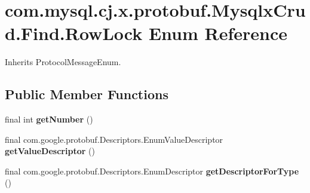 \hypertarget{enumcom_1_1mysql_1_1cj_1_1x_1_1protobuf_1_1_mysqlx_crud_1_1_find_1_1_row_lock}{}\section{com.\+mysql.\+cj.\+x.\+protobuf.\+Mysqlx\+Crud.\+Find.\+Row\+Lock Enum Reference}
\label{enumcom_1_1mysql_1_1cj_1_1x_1_1protobuf_1_1_mysqlx_crud_1_1_find_1_1_row_lock}


Inherits Protocol\+Message\+Enum.

\subsection*{Public Member Functions}
\begin{DoxyCompactItemize}
\item 
\mbox{\label{enumcom_1_1mysql_1_1cj_1_1x_1_1protobuf_1_1_mysqlx_crud_1_1_find_1_1_row_lock_a498da78d14366366a0fb9db39fffd00a}} 
final int {\bfseries get\+Number} ()
\item 
\mbox{\label{enumcom_1_1mysql_1_1cj_1_1x_1_1protobuf_1_1_mysqlx_crud_1_1_find_1_1_row_lock_ac8daee92f92c75ebc6a0394cc068edd7}} 
final com.\+google.\+protobuf.\+Descriptors.\+Enum\+Value\+Descriptor {\bfseries get\+Value\+Descriptor} ()
\item 
\mbox{\label{enumcom_1_1mysql_1_1cj_1_1x_1_1protobuf_1_1_mysqlx_crud_1_1_find_1_1_row_lock_acda587d86247c6a7ea3374b640da3e3a}} 
final com.\+google.\+protobuf.\+Descriptors.\+Enum\+Descriptor {\bfseries get\+Descriptor\+For\+Type} ()
\end{DoxyCompactItemize}
